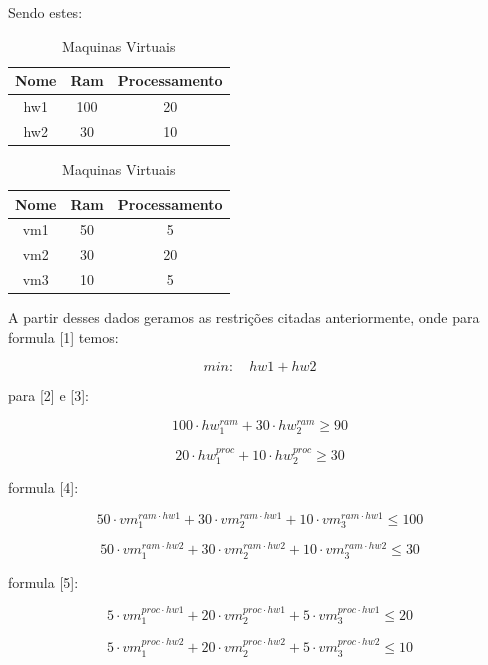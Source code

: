 Sendo estes:

\begin{table}[!htb]
    \caption{hardware e maquinas virtuais}
    \begin{minipage}{.5\linewidth}
      \caption{Hardware}
      \centering
        \begin{tabular}{ |c|c|c| } 
            \hline
            Nome & Ram & Processamento\\
            \hline
             hw1 & 100 & 20  \\ 
             hw2 & 30 & 10  \\ 

            \hline
        \end{tabular}
    \end{minipage}%
    \begin{minipage}{.5\linewidth}
      \centering
        \caption{Maquinas Virtuais}
        \begin{tabular}{ |c|c|c| } 
            \hline
            Nome & Ram & Processamento\\
            \hline
            vm1 & 50  & 5  \\ 
            vm2  & 30 & 20  \\ 
            vm3 & 10 & 5   \\
            \hline
        \end{tabular}
    \end{minipage} 
\end{table}

A partir desses dados geramos as restrições citadas anteriormente, onde para formula [1] temos:

    $$min: \quad hw1 + hw2 $$

para [2] e [3]:

    $$ 100 \cdot hw_1^{ram} + 30 \cdot hw_2^{ram} \geq 90$$

    $$ 20 \cdot hw_1^{proc} + 10 \cdot hw_2^{proc}  \geq 30$$
    

formula [4]:

$$ 50 \cdot vm_1^{ram \cdot hw1} + 30 \cdot vm_2^{ram \cdot hw1} + 10 \cdot vm_3^{ram \cdot hw1}\leq 100$$


$$ 50 \cdot vm_1^{ram \cdot hw2} + 30 \cdot vm_2^{ram \cdot hw2} + 10 \cdot vm_3^{ram \cdot hw2}\leq 30$$

formula [5]:

$$ 5 \cdot vm_1^{proc \cdot hw1} + 20 \cdot vm_2^{proc \cdot hw1} + 5 \cdot vm_3^{proc \cdot hw1}\leq 20$$


$$ 5 \cdot vm_1^{proc \cdot hw2} + 20 \cdot vm_2^{proc \cdot hw2} + 5 \cdot vm_3^{proc \cdot hw2}\leq 10$$

